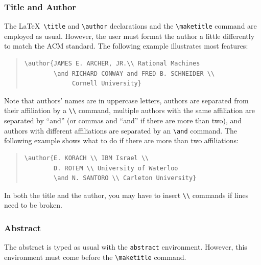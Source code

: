 \documentclass[acmtocl]{acmtrans2m}
\begin{document}
\subsubsection{Title and Author}
The \LaTeX\ \verb|\title| and \verb|\author| declarations and the
\verb|\maketitle| command are employed as usual.  However, the user
must format the author a little differently to match the ACM standard.
The following example \cite{6:1:1} illustrates most features:
\begin{quote}
\begin{verbatim}
\author{JAMES E. ARCHER, JR.\\ Rational Machines
        \and RICHARD CONWAY and FRED B. SCHNEIDER \\ 
             Cornell University}
\end{verbatim}
\end{quote}
Note that authors' names are in uppercase letters, authors are
separated from their affiliation by a \verb|\\| command, multiple
authors with the same affiliation are separated by ``and'' (or commas
and ``and'' if there are more than two), and authors with different
affiliations are separated by an \verb|\and| command.  The following
example \cite{6:3:380} shows what to do if there are more than
two affiliations:
\begin{quote}
\begin{verbatim}
\author{E. KORACH \\ IBM Israel \\
        D. ROTEM \\ University of Waterloo
        \and N. SANTORO \\ Carleton University}
\end{verbatim}
\end{quote}
In both the title and the author, you may have to insert \verb|\\|
commands if lines need to be broken. 

\subsubsection{Abstract}
The abstract is typed as usual with the {\tt abstract} environment.
However, this environment must come before the \verb|\maketitle|
command.
\end{document}
